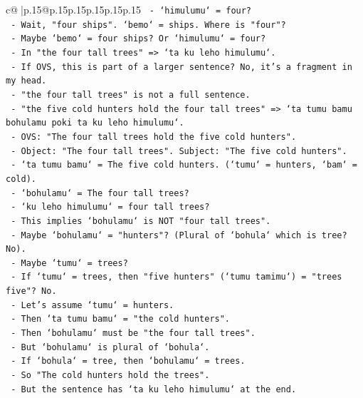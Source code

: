 \documentclass{article}
\begin{document}
{\begin{supertabular}{c@{$\;$}|p{.15\linewidth}@{}p{.15\linewidth}p{.15\linewidth}p{.15\linewidth}p{.15\linewidth}p{.15\linewidth}}
{{{\texttt{          {-} `himulumu` = four?} \\
\texttt{          {-} Wait, "four ships". `bemo` = ships. Where is "four"?} \\
\texttt{          {-} Maybe `bemo` = four ships? Or `himulumu` = four?} \\
\texttt{          {-} In "the four tall trees" => `ta ku leho himulumu`.} \\
\texttt{          {-} If OVS, this is part of a larger sentence? No, it's a fragment in my head.} \\
\texttt{          {-} "the four tall trees" is not a full sentence.} \\
\texttt{          {-} "the five cold hunters hold the four tall trees" => `ta tumu bamu bohulamu poki ta ku leho himulumu`.} \\
\texttt{          {-} OVS: "The four tall trees hold the five cold hunters".} \\
\texttt{          {-} Object: "The four tall trees". Subject: "The five cold hunters".} \\
\texttt{          {-} `ta tumu bamu` = The five cold hunters. (`tumu` = hunters, `bam` = cold).} \\
\texttt{          {-} `bohulamu` = The four tall trees?} \\
\texttt{          {-} `ku leho himulumu` = four tall trees?} \\
\texttt{          {-} This implies `bohulamu` is NOT "four tall trees".} \\
\texttt{          {-} Maybe `bohulamu` = "hunters"? (Plural of `bohula` which is tree? No).} \\
\texttt{          {-} Maybe `tumu` = trees?} \\
\texttt{          {-} If `tumu` = trees, then "five hunters" (`tumu tamimu`) = "trees five"? No.} \\
\texttt{          {-} Let's assume `tumu` = hunters.} \\
\texttt{          {-} Then `ta tumu bamu` = "the cold hunters".} \\
\texttt{          {-} Then `bohulamu` must be "the four tall trees".} \\
\texttt{          {-} But `bohulamu` is plural of `bohula`.} \\
\texttt{          {-} If `bohula` = tree, then `bohulamu` = trees.} \\
\texttt{          {-} So "The cold hunters hold the trees".} \\
\texttt{          {-} But the sentence has `ta ku leho himulumu` at the end.} \\
}}}
\end{supertabular}}
\end{document}
